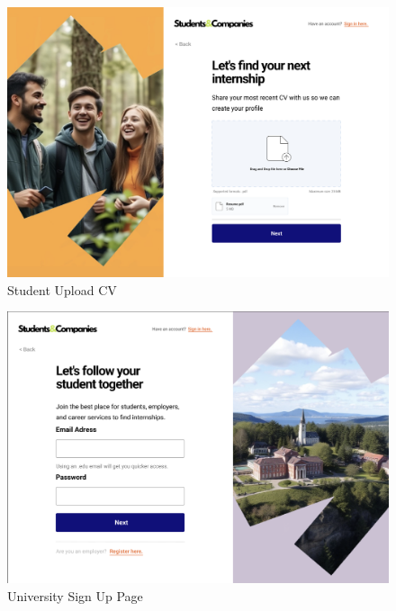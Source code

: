 \documentclass{article}
\begin{document}
\begin{figure}[H]
    \centering
    \includegraphics[scale = 0.42]{figures/UserInterfaces/General/StudentUploadCV.png}
    \caption{Student Upload CV}
    \centering
\end{figure}
\begin{figure}[H]
    \centering
    \includegraphics[scale = 0.45]{figures/UserInterfaces/General/UniversitySignUp.png}
    \caption{University Sign Up Page}
    \centering
\end{figure}
\end{document}
